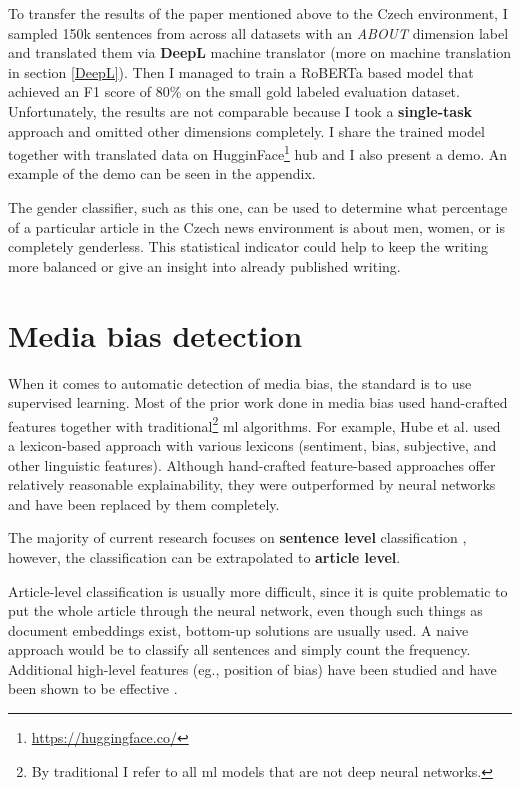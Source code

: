 To transfer the results of the paper mentioned above to the Czech environment, I sampled 150k sentences from across all datasets with an \textit{ABOUT} dimension label and translated them via \textbf{DeepL} machine translator (more on machine translation in section \ref{DeepL}). Then I managed to train a RoBERTa based model that achieved an F1 score of 80\% on the small gold labeled evaluation dataset. Unfortunately, the results are not comparable because I took a \textbf{single-task} approach and omitted other dimensions completely. I share the trained model together with translated data on HugginFace\footnote{\url{https://huggingface.co/}} hub and I also present a demo. An example of the demo can be seen in the appendix.

The gender classifier, such as this one, can be used to determine what percentage of a particular article in the Czech news environment is about men, women, or is completely genderless. This statistical indicator could help to keep the writing more balanced or give an insight into already published writing.





\section{Media bias detection}\label{mediabias}
When it comes to automatic detection of media bias, the standard is to use supervised learning. Most of the prior work done in media bias used hand-crafted features together with traditional\footnote{By traditional I refer to all \Gls{ml} models that are not deep neural networks.} \Gls{ml} algorithms. For example, Hube et al. \cite{hube2018detecting} used a lexicon-based approach with various lexicons (sentiment, bias, subjective, and other linguistic features). Although hand-crafted feature-based approaches offer relatively reasonable explainability, they were outperformed by neural networks and have been replaced by them completely.

The majority of current research focuses on \textbf{sentence level} classification \cite{sinha2021determining,Spinde2021MBIC,lee2021unifying,hube2019neural}, however, the classification can be extrapolated to \textbf{article level}.

Article-level classification is usually more difficult, since it is quite problematic to put the whole article through the neural network, even though such things as document embeddings exist, bottom-up solutions are usually used. A naive approach would be to classify all sentences and simply count the frequency. Additional high-level features (eg., position of bias) have been studied and have been shown to be effective \cite{chen2020detecting,chen-etal-2020-analyzing}.

